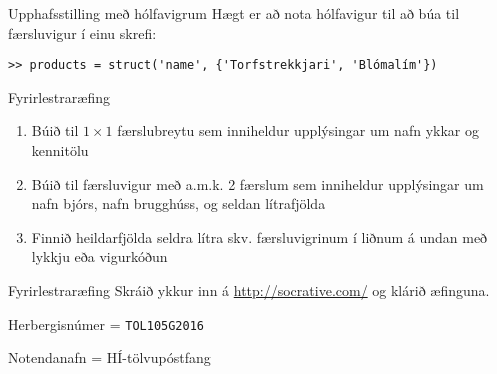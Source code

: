 \documentclass[handout]{beamer}
\begin{document}
\begin{frame}[fragile]{Upphafsstilling með hólfavigrum}
Hægt er að nota hólfavigur til að búa til færsluvigur í einu skrefi:

\begin{verbatim}
>> products = struct('name', {'Torfstrekkjari', 'Blómalím'})
\end{verbatim}

\end{frame}


\begin{frame}{Fyrirlestraræfing}
\begin{enumerate}
 \item Búið til $1 \times 1$ færslubreytu sem inniheldur upplýsingar um nafn ykkar og kennitölu
 \item Búið til færsluvigur með a.m.k. 2 færslum sem inniheldur upplýsingar um nafn bjórs, nafn brugghúss, og seldan lítrafjölda
 \item Finnið heildarfjölda seldra lítra skv. færsluvigrinum í liðnum á undan með lykkju eða vigurkóðun
\end{enumerate}
\end{frame}

\begin{frame}{Fyrirlestraræfing}
Skráið ykkur inn á \url{http://socrative.com/} og klárið æfinguna.

Herbergisnúmer = \texttt{TOL105G2016}

Notendanafn = HÍ-tölvupóstfang
\end{frame}
\end{document}
